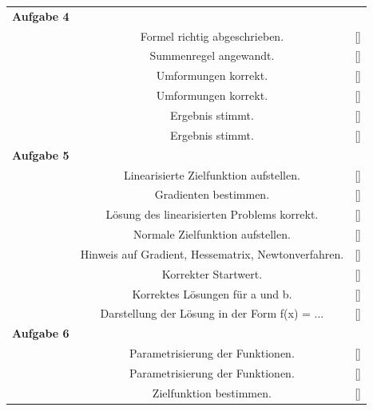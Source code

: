\documentclass[11pt,final]{scrreprt}
\begin{document}
\newpage
\begin{tabular}{rcl}

\textbf{Aufgabe 4} &  &  \\  
 & Formel richtig abgeschrieben. & [\hspace*{0.3cm}] \\ 
 & Summenregel angewandt. & [\hspace*{0.3cm}] \\ 
 & Umformungen korrekt. & [\hspace*{0.3cm}] \\ 
 & Umformungen korrekt. & [\hspace*{0.3cm}] \\ 
 & Ergebnis stimmt. & [\hspace*{0.3cm}] \\
 & Ergebnis stimmt.  & [\hspace*{0.3cm}] \\  
\textbf{Aufgabe 5} &  &  \\  
 & Linearisierte Zielfunktion aufstellen. & [\hspace*{0.3cm}] \\ 
 & Gradienten bestimmen. & [\hspace*{0.3cm}] \\ 
 & Lösung des linearisierten Problems korrekt. & [\hspace*{0.3cm}] \\ 
 & Normale Zielfunktion aufstellen. & [\hspace*{0.3cm}] \\
 & Hinweis auf Gradient, Hessematrix, Newtonverfahren. & [\hspace*{0.3cm}] \\ 
 & Korrekter Startwert. & [\hspace*{0.3cm}] \\ 
 & Korrektes Lösungen für a und b. & [\hspace*{0.3cm}] \\ 
 & Darstellung der Lösung in der Form f(x) = ... & [\hspace*{0.3cm}] \\  
\textbf{Aufgabe 6} &  &  \\  
 & Parametrisierung der Funktionen. & [\hspace*{0.3cm}] \\ 
 & Parametrisierung der Funktionen. & [\hspace*{0.3cm}] \\
 & Zielfunktion bestimmen. & [\hspace*{0.3cm}] \\ 

\end{tabular}
\end{document}
